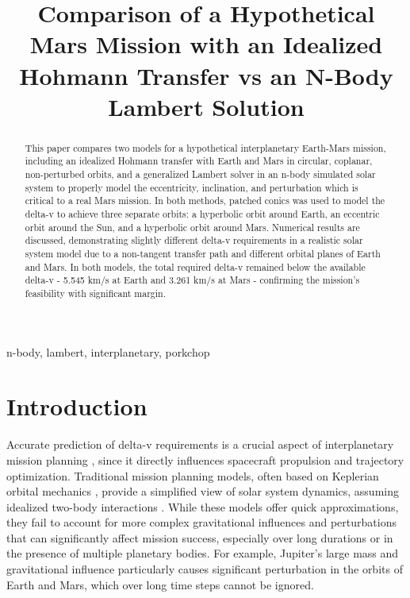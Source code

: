 \documentclass[conference]{IEEEtran}
\begin{document}
	
	\title{Comparison of a Hypothetical Mars Mission with an Idealized Hohmann Transfer vs an N-Body Lambert Solution }
	
	\author{
	}
	
	\maketitle
	
	\begin{abstract}
		This paper compares two models for a hypothetical interplanetary Earth-Mars mission, including an idealized Hohmann transfer with Earth and Mars in circular, coplanar, non-perturbed orbits, and a generalized Lambert solver in an n-body simulated solar system to properly model the eccentricity, inclination, and perturbation which is critical to a real Mars mission. In both methods, patched conics was used to model the delta-v to achieve three separate orbits: a hyperbolic orbit around Earth, an eccentric orbit around the Sun, and a hyperbolic orbit around Mars. Numerical results are discussed, demonstrating slightly different delta-v requirements in a realistic solar system model due to a non-tangent transfer path and different orbital planes of Earth and Mars. In both models, the total required delta-v remained below the available delta-v - 5.545 km/s at Earth and 3.261 km/s at Mars - confirming the mission's feasibility with significant margin.
	\end{abstract}
	
	\begin{IEEEkeywords}
		n-body, lambert, interplanetary, porkchop
	\end{IEEEkeywords}
	
\section{Introduction}
Accurate prediction of delta-v requirements is a crucial aspect of interplanetary mission planning \cite{b1}, since it directly influences spacecraft propulsion and trajectory optimization. Traditional mission planning models, often based on Keplerian orbital mechanics \cite{b2}, provide a simplified view of solar system dynamics, assuming idealized two-body interactions \cite{b4}. While these models offer quick approximations, they fail to account for more complex gravitational influences and perturbations that can significantly affect mission success, especially over long durations or in the presence of multiple planetary bodies. For example, Jupiter’s large mass and gravitational influence particularly causes significant perturbation in the orbits of Earth and Mars, which over long time steps cannot be ignored.\\
\end{document}
